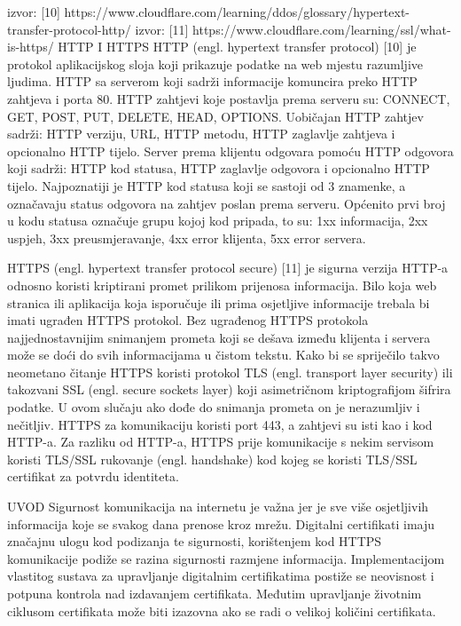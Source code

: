\documentclass[]{foi}
\begin{document}
izvor: [10] https://www.cloudflare.com/learning/ddos/glossary/hypertext-transfer-protocol-http/
izvor: [11] https://www.cloudflare.com/learning/ssl/what-is-https/
HTTP I HTTPS
HTTP (engl. hypertext transfer protocol) [10] je protokol aplikacijskog sloja koji prikazuje podatke na web mjestu razumljive ljudima. 
HTTP sa serverom koji sadrži informacije komuncira preko HTTP zahtjeva i porta 80. 
HTTP zahtjevi koje postavlja prema serveru su: CONNECT, GET, POST, PUT, DELETE, HEAD, OPTIONS.
Uobičajan HTTP zahtjev sadrži: HTTP verziju, URL, HTTP metodu, HTTP zaglavlje zahtjeva i opcionalno HTTP tijelo. 
Server prema klijentu odgovara pomoću HTTP odgovora koji sadrži: HTTP kod statusa, HTTP zaglavlje odgovora i opcionalno HTTP tijelo.
Najpoznatiji je HTTP kod statusa koji se sastoji od 3 znamenke, a označavaju status odgovora na zahtjev poslan prema serveru.
Općenito prvi broj u kodu statusa označuje grupu kojoj kod pripada, to su: 1xx informacija, 2xx uspjeh, 3xx preusmjeravanje, 4xx error klijenta, 5xx error servera. 

HTTPS (engl. hypertext transfer protocol secure) [11] je sigurna verzija HTTP-a odnosno koristi kriptirani promet prilikom prijenosa informacija.
Bilo koja web stranica ili aplikacija koja isporučuje ili prima osjetljive informacije trebala bi imati ugrađen HTTPS protokol.
Bez ugrađenog HTTPS protokola najjednostavnijim snimanjem prometa koji se dešava između klijenta i servera može se doći do svih informacijama u čistom tekstu.
Kako bi se spriječilo takvo neometano čitanje HTTPS koristi protokol TLS (engl. transport layer security) ili takozvani SSL (engl. secure sockets layer) koji asimetričnom kriptografijom šifrira podatke.
U ovom slučaju ako dođe do snimanja prometa on je nerazumljiv i nečitljiv.
HTTPS za komunikaciju koristi port 443, a zahtjevi su isti kao i kod HTTP-a.
Za razliku od HTTP-a, HTTPS prije komunikacije s nekim servisom koristi TLS/SSL rukovanje (engl. handshake) kod kojeg se koristi TLS/SSL certifikat za potvrdu identiteta.


UVOD
Sigurnost komunikacija na internetu je važna jer je sve više osjetljivih informacija koje se svakog dana prenose kroz mrežu.
Digitalni certifikati imaju značajnu ulogu kod podizanja te sigurnosti, korištenjem kod HTTPS komunikacije podiže se razina sigurnosti razmjene informacija.
Implementacijom vlastitog sustava za upravljanje digitalnim certifikatima postiže se neovisnost i potpuna kontrola nad izdavanjem certifikata.
Međutim upravljanje životnim ciklusom certifikata može biti izazovna ako se radi o velikoj količini certifikata.
\end{document}
